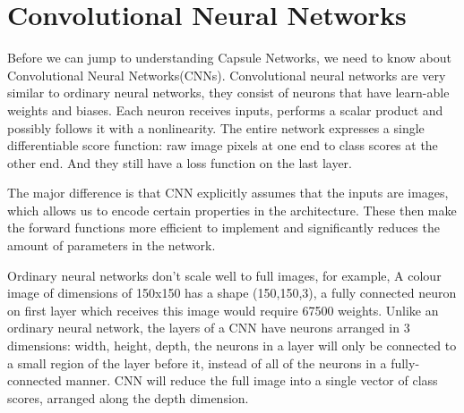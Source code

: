 \section{Convolutional Neural Networks} %
\label{sec:convolutional_neural_networks}
Before we can jump to understanding Capsule Networks, we need to know about Convolutional Neural Networks(CNNs). Convolutional neural networks are very similar to ordinary neural networks, they consist of neurons that have learn-able weights and biases. Each neuron receives inputs, performs a scalar product and possibly follows it with a nonlinearity. The entire network expresses a single differentiable score function: raw image pixels at one end to class scores at the other end. And they still have a loss function on the last layer.\par\bigskip
The major difference is that CNN explicitly assumes that the inputs are images, which allows us to encode certain properties in the architecture. These then make the forward functions more efficient to implement and significantly reduces the amount of parameters in the network.\par\bigskip
Ordinary neural networks don’t scale well to full images, for example, A colour image of dimensions of 150x150 has a shape (150,150,3), a fully connected neuron on first layer which receives this image would require 67500 weights. Unlike an ordinary neural network, the layers of a CNN have neurons arranged in 3 dimensions: width, height, depth, the neurons in a layer will only be connected to a small region of the layer before it, instead of all of the neurons in a fully-connected manner. CNN  will reduce the full image into a single vector of class scores, arranged along the depth dimension.
